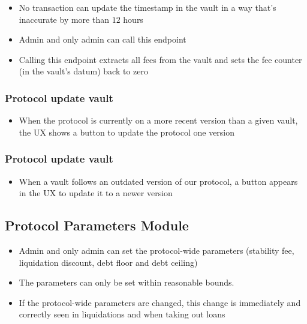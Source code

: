 \documentclass{article} %
\begin{document}
\begin{itemize}
  \item No transaction can update the timestamp in the vault in a way that's
    inaccurate by more than $12$ hours
  \item Admin and only admin can call this endpoint
  \item Calling this endpoint extracts all fees from the vault and sets the fee
    counter (in the vault's datum) back to zero
\end{itemize}

\subsubsection*{Protocol update vault}

\begin{itemize}
  \item When the protocol is currently on a more recent version than a given
    vault, the UX shows a button to update the protocol one version
\end{itemize}


\subsubsection*{Protocol update vault}

\begin{itemize}
  \item When a vault follows an outdated version of our protocol, a button
    appears in the UX to update it to a newer version
\end{itemize}

\subsection{Protocol Parameters Module}

\begin{itemize}
  \item Admin and only admin can set the protocol-wide parameters (stability
    fee, liquidation discount, debt floor and debt ceiling)
  \item The parameters can only be set within reasonable bounds. 
  \item If the protocol-wide parameters are changed, this change is immediately
    and correctly seen in liquidations and when taking out loans
\end{itemize}  
\end{document}
